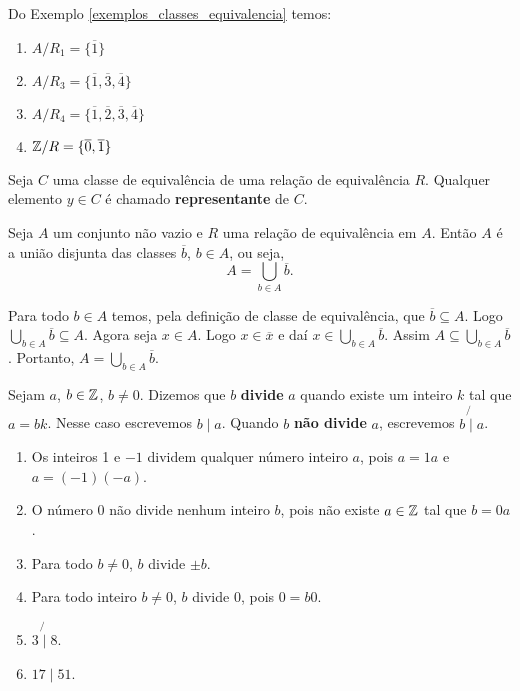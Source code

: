 \begin{exemplos}
    Do Exemplo \ref{exemplos_classes_equivalencia} temos:
    \begin{enumerate}[label={\arabic*})]
        \item $A/R_1 = \{\overline{1}\}$
        \item $A/R_3 = \{\overline{1},\overline{3},\overline{4}\}$
        \item $A/R_4 = \{\overline{1},\overline{2},\overline{3},\overline{4}\}$
        \item $\mathbb{Z}/R = \{\overline{0},\overline{1}\}$
    \end{enumerate}
\end{exemplos}

\begin{definicao}
    Seja $C$ uma classe de equivalência de uma relação de equivalência $R$. Qualquer elemento $y\in C$ é chamado \textbf{representante} de $C$.
\end{definicao}

\begin{proposicao}
    Seja $A$ um conjunto não vazio e $R$ uma relação de equivalência em $A$. Então $A$ é a união disjunta das classes $\overline{b}$, $b \in A$, ou seja,
    \[
        A = \bigcup_{b\in A}\overline{b}.
    \]
\end{proposicao}
\begin{prova}
    Para todo $b\in A$ temos, pela definição de classe de equivalência, que $\overline{b}\subseteq A$. Logo $\bigcup_{b\in A}\overline{b}\subseteq A$. Agora seja $x\in A$. Logo $x \in \overline{x}$ e daí $x\in \bigcup_{b\in A}\overline{b}$. Assim $A\subseteq\bigcup_{b\in A}\overline{b}$. Portanto, $A=\bigcup_{b\in A}\overline{b}$.
\end{prova}

\begin{definicao}
    Sejam $a$, $b \in \mathbb{Z}$, $b \neq 0$. Dizemos que $b$ \textbf{divide} $a$ quando existe um inteiro $k$ tal que $a=bk$.
    Nesse caso escrevemos $b \mid a$. Quando $b$ \textbf{não divide} $a$, escrevemos $b\not{\mid}a$.
\end{definicao}

\begin{exemplos}
    \begin{enumerate}[label={\arabic*})]
        \item Os inteiros 1 e $-1$ dividem qualquer número inteiro $a$, pois $a = 1 a$ e $a = (-1)(-a)$.
        \item O número 0 não divide nenhum inteiro $b$, pois não existe $a \in \mathbb{Z}$ tal que $b = 0a$.
        \item Para todo $b\neq 0$, $b$ divide $\pm b$.
        \item Para todo inteiro $b\neq 0$, $b$ divide 0, pois $0 = b0$.
        \item $3 \not{\mid} 8$.
        \item $17 \mid 51$.
    \end{enumerate}
\end{exemplos}

